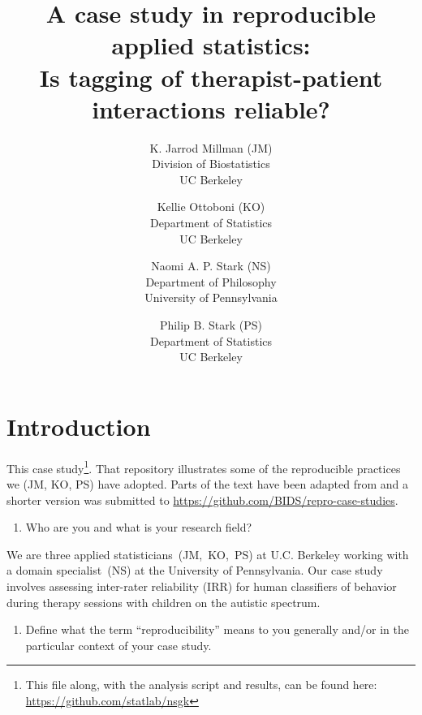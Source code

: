 \documentclass[]{article}
\date{}
\begin{document}
\title{A case study in reproducible applied statistics:\\
Is tagging of therapist-patient interactions reliable?
}

\author{K. Jarrod Millman (JM)\\ Division of Biostatistics\\ UC Berkeley \and
Kellie Ottoboni (KO)\\ Department of Statistics\\ UC Berkeley \and
Naomi A. P. Stark (NS)\\ Department of Philosophy\\ University of Pennsylvania \and
Philip B. Stark (PS)\\ Department of Statistics\\ UC Berkeley
}

\maketitle


\section{Introduction}

This case study\footnote{This file along, with the analysis script and results,
can be found here: \url{https://github.com/statlab/nsgk}}.
That repository illustrates some of
the reproducible practices we (JM, KO, PS) have adopted.
Parts of the text have been adapted from \citet{millman2015thesis} and a
shorter version was submitted to
\url{https://github.com/BIDS/repro-case-studies}.


\begin{enumerate}
\def\labelenumi{\arabic{enumi})}
\itemsep1pt\parskip0pt
\item
  Who are you and what is your research field?
\end{enumerate}

We are three applied statisticians~(JM,~KO,~PS) at U.C. Berkeley working with a
domain specialist~(NS) at the University of Pennsylvania.
Our case study involves assessing inter-rater reliability (IRR) for human
classifiers of behavior during therapy sessions with children on the autistic spectrum.

\begin{enumerate}
\def\labelenumi{\arabic{enumi})}
\setcounter{enumi}{1}
\itemsep1pt\parskip0pt
\item
  Define what the term ``reproducibility'' means to you generally and/or
  in the particular context of your case study.
\end{enumerate}
\end{document}

